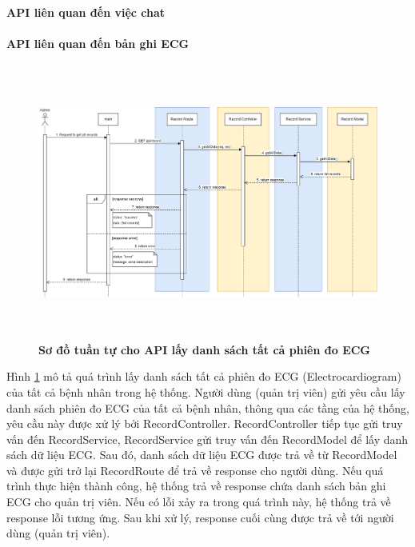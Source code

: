 

\paragraph{API liên quan đến việc chat}
\mbox{}


\paragraph{API liên quan đến bản ghi ECG}
\mbox{}

\begin{figure}[H]
  \centering
  \includegraphics[width=16cm,height=9cm]{Images/sequence_api/getAllRecord.png}
  \caption[Sơ đồ tuần tự cho API lấy danh sách tất cả phiên đo ECG ]{\bfseries \fontsize{12pt}{0pt}
  \selectfont Sơ đồ tuần tự cho API lấy danh sách tất cả phiên đo ECG }
  \label{getAllEcgRecords} %
\end{figure}
Hình \ref{getAllEcgRecords} mô tả quá trình lấy danh sách tất cả phiên đo ECG (Electrocardiogram) của tất cả bệnh nhân trong hệ thống. Người dùng (quản trị viên) gửi yêu cầu lấy danh sách phiên đo ECG của tất cả bệnh nhân, thông qua các tầng của hệ thống, 
yêu cầu này được xử lý bởi RecordController. RecordController tiếp tục gửi truy vấn đến RecordService, RecordService gửi truy vấn đến RecordModel để lấy danh sách dữ liệu ECG. Sau đó, danh sách dữ liệu ECG được trả về từ RecordModel và được gửi trở lại RecordRoute
 để trả về response cho người dùng. Nếu quá trình thực hiện thành công, hệ thống trả về response chứa danh sách bản ghi ECG cho quản trị viên. Nếu có lỗi xảy ra trong quá trình này, hệ thống trả về response lỗi tương ứng. Sau khi xử lý, response cuối cùng được trả về tới người dùng (quản trị viên).

